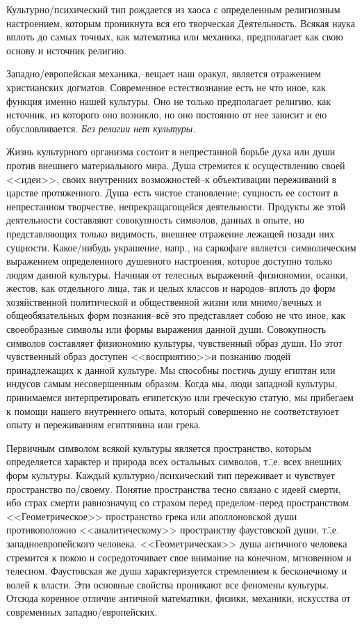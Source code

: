 Культурно\-/психический тип рождается из хаоса с определенным религиозным настроением, которым проникнута вся его творческая Деятельность. Всякая наука вплоть до самых точных, как математика или механика, предполагает как свою основу и источник религию.

Западно\-/европейская механика,\---вещает наш оракул, является отражением христианских догматов. Современное естествознание есть не что иное, как функция именно нашей культуры. Оно не только предполагает религию, как источник, из которого оно возникло, но оно постоянно от нее зависит и ею обусловливается. \emph{Без религии нет культуры.}

Жизнь культурного организма состоит в непрестанной борьбе духа или души против внешнего материального мира. Душа стремится к осуществлению своей <<идеи>>, своих внутренних возможностей\---к объективации переживаний в царстве протяженного. Душа\---есть чистое становление; сущность ее состоит в непрестанном творчестве, непрекращагощейся деятельности. Продукты же этой деятельности составляют совокупность символов, данных в опыте, но представляющих только видимость, внешнее отражение лежащей позади них сущности. Какое\-/нибудь украшение, напр., на саркофаге является\---символическим выражением определенного душевного настроения, которое доступно только людям данной культуры. Начиная от телесных выражений\---физиономии, осанки, жестов, как отдельного лица, так и целых классов и народов\---вплоть до форм хозяйственной политической и общественной жизни или мнимо\-/вечных и общеобязательных форм познания\---всё это представляет собою не что иное, как своеобразные символы или формы выражения данной души. Совокупность символов составляет физиономию культуры, чувственный образ души. Но этот чувственный образ доступен <<восприятию>>и познанию людей принадлежащих к данной культуре. Мы способны постичь душу египтян или индусов самым несовершенным образом. Когда мы, люди западной культуры, принимаемся интерпретировать египетскую или греческую статую, мы прибегаем к помощи нашего внутреннего опыта, который совершенно не соответствуюет опыту и переживаниям египтянина или грека.

Первичным символом всякой культуры является пространство, которым определяется характер и природа всех остальных символов, т.\=,е. всех внешних форм культуры. Каждый культурно\-/психический тип переживает и чувствует пространство по\-/своему. Понятие пространства тесно связано с идеей смерти, ибо страх смерти равнозначущ со страхом перед пределом\---перед пространством. <<Геометрическое>> пространство грека или аполлоновской души противоположно <<аналитическому>> пространству фаустовской души, т.\=,е. западноевропейского человека. <<Геометрическая>> душа античного человека стремится к покою и сосредоточивает свое внимание на конечном, мгновенном и телесном. Фаустовская же душа характеризуется стремлением к бесконечному и волей к власти. Эти основные свойства проникают все феномены культуры. Отсюда коренное отличие античной математики, физики, механики, искусства от современных западно\-/европейских.


